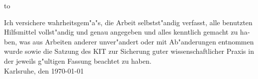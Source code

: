 \begin{otherlanguage}{ngerman}  
\thispagestyle{empty}
\vspace*{30\baselineskip}
\hbox to \textwidth{\hrulefill}
\par
\noindent Ich versichere wahrheitsgem"a"s, die Arbeit selbstst"andig verfasst, alle benutzten Hilfsmittel vollst"andig und genau angegeben und alles kenntlich gemacht zu haben, was aus Arbeiten anderer unver"andert oder mit Ab"anderungen entnommen wurde sowie die Satzung des KIT zur Sicherung guter wissenschaftlicher Praxis in der jeweils g"ultigen Fassung beachtet zu haben.\\

\noindent Karlsruhe, den \today
\end{otherlanguage}

\clearpage






